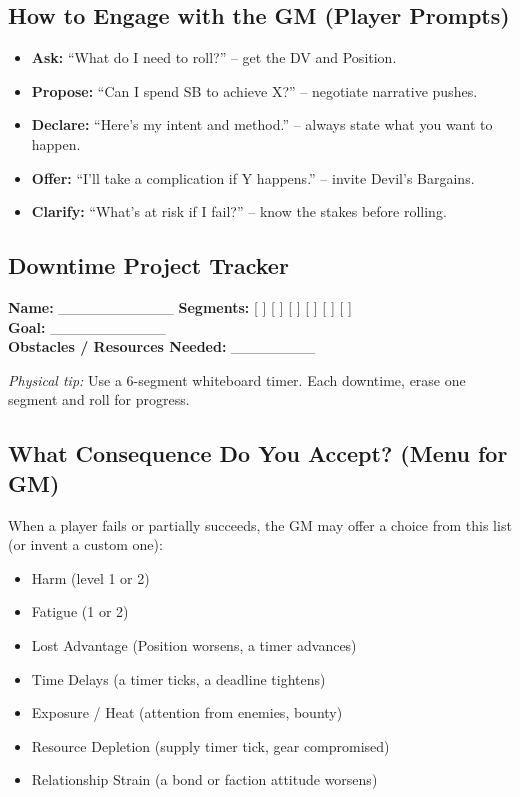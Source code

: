 \subsection{How to Engage with the GM (Player Prompts)}

\begin{itemize}
    \item \textbf{Ask:} ``What do I need to roll?'' -- get the DV and Position.
    \item \textbf{Propose:} ``Can I spend SB to achieve X?'' -- negotiate narrative pushes.
    \item \textbf{Declare:} ``Here's my intent and method.'' -- always state what you want to happen.
    \item \textbf{Offer:} ``I'll take a complication if Y happens.'' -- invite Devil's Bargains.
    \item \textbf{Clarify:} ``What's at risk if I fail?'' -- know the stakes before rolling.
\end{itemize}

\subsection{Downtime Project Tracker}

\begin{tcolorbox}[colback=white,colframe=black,left=1em,right=1em,breakable]
\textbf{Name:} \_\_\_\_\_\_\_\_\_\_\_  \qquad \textbf{Segments:} [ ] [ ] [ ] [ ] [ ] [ ] \\
\textbf{Goal:} \_\_\_\_\_\_\_\_\_\_\_ \\
\textbf{Obstacles / Resources Needed:} \_\_\_\_\_\_\_\_
\end{tcolorbox}

\emph{Physical tip:} Use a 6-segment whiteboard timer. Each downtime, erase one segment and roll for progress.

\subsection{What Consequence Do You Accept? (Menu for GM)}
\label{app:consequence-menu}

When a player fails or partially succeeds, the GM may offer a choice from this list (or invent a custom one):
\begin{itemize}
    \item Harm (level 1 or 2)
    \item Fatigue (1 or 2)
    \item Lost Advantage (Position worsens, a timer advances)
    \item Time Delays (a timer ticks, a deadline tightens)
    \item Exposure / Heat (attention from enemies, bounty)
    \item Resource Depletion (supply timer tick, gear compromised)
    \item Relationship Strain (a bond or faction attitude worsens)
\end{itemize}

